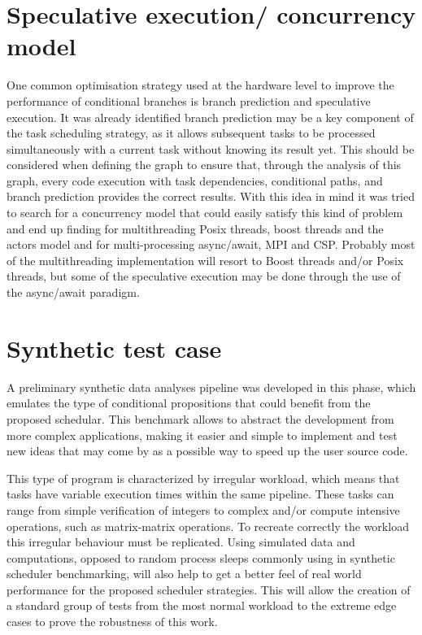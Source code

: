 \section{Speculative execution/ concurrency model}
One common optimisation strategy used at the hardware level to improve the performance of conditional branches is branch prediction and speculative execution. It was already identified branch prediction may be a key component of the task scheduling strategy, as it allows subsequent tasks to be processed simultaneously with a current task without knowing its result yet. This should be considered when defining the graph to ensure that, through the analysis of this graph, every code execution with task dependencies, conditional paths, and branch prediction provides the correct results.
With this idea in mind it was tried to search for a concurrency model that could easily satisfy this kind of problem and end up finding for multithreading Posix threads, boost threads and the  actors model and for multi-processing async/await, MPI and CSP.
Probably most of the multithreading implementation will resort to Boost threads and/or Posix threads, but some of the speculative execution may be done through the use of the async/await paradigm.

\section{Synthetic test case}
A preliminary synthetic data analyses pipeline was developed in this phase, which emulates the type of conditional propositions that could benefit from the proposed schedular. This benchmark allows to abstract the development from more complex applications, making it easier and simple to implement and test new ideas that may come by as a possible way to speed up the user source code.

This type of program is characterized by irregular workload, which means that tasks have variable execution times within the same pipeline. These tasks can range from simple verification of integers to complex and/or compute intensive operations, such as matrix-matrix operations. To recreate correctly the workload this irregular behaviour must be replicated.
Using simulated data and computations, opposed to random process sleeps commonly using in synthetic scheduler benchmarking, will also help to get a better feel of real world performance for the proposed scheduler strategies. This will allow the creation of a standard group of tests from the most normal workload to the extreme edge cases to prove the robustness of this work.

